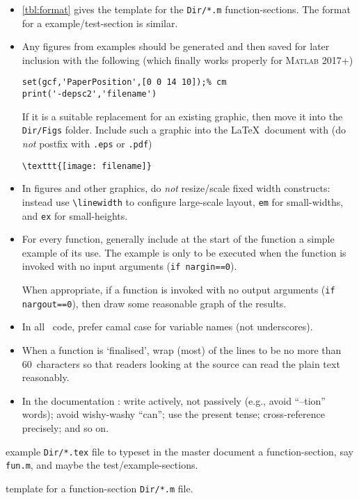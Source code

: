 \begin{itemize}
\item \autoref{tbl:format} gives the template for the \verb|Dir/*.m| function-sections.
The format for a example\slash test-section is similar.

\item Any figures from examples should be generated and then saved for later inclusion with the following (which finally works properly for \textsc{Matlab} 2017+)
\begin{verbatim}
set(gcf,'PaperPosition',[0 0 14 10]);% cm
print('-depsc2','filename')
\end{verbatim}
If it is a suitable replacement for an existing graphic, then move it into the \verb|Dir/Figs| folder.
Include such a graphic into the \LaTeX\ document with (do \emph{not} postfix with \verb|.eps| or \verb|.pdf|)
\begin{verbatim}
\texttt{[image: filename]}
\end{verbatim}

\item   In figures and other graphics, do \emph{not} resize\slash scale fixed width constructs: instead use \verb|\linewidth| to configure large-scale layout, \verb|em| for small-widths, and \verb|ex| for small-heights. 


\item For every function, generally include at the start of the function a simple example of its use.  The example is only to be executed when the function is invoked with no input arguments (\verb|if nargin==0|).

When appropriate, if a function is invoked with no output arguments (\verb|if nargout==0|), then draw some reasonable graph of the results.


\item In all \script\ code, prefer camal case for variable names (not underscores).

\item When a function is `finalised', wrap (most) of the lines to be no more than 60~characters so that readers looking at the source can read the plain text reasonably.


\item In the documentation \cite[e.g.,][Ch.~4]{Higham98}: 
write actively, not passively (e.g., avoid ``--tion'' words);
avoid wishy-washy ``can'';
use the present tense;
cross-reference precisely;
and so on.

\end{itemize}


\begin{table}
\caption{\label{tbl:funtex}example \texttt{Dir/*.tex} file to typeset in the master document a function-section, say \texttt{fun.m}, and maybe the test\slash example-sections.}
\end{table}
\begin{table}
\caption{\label{tbl:format}template for a function-section \texttt{Dir/*.m} file.}
\end{table}


